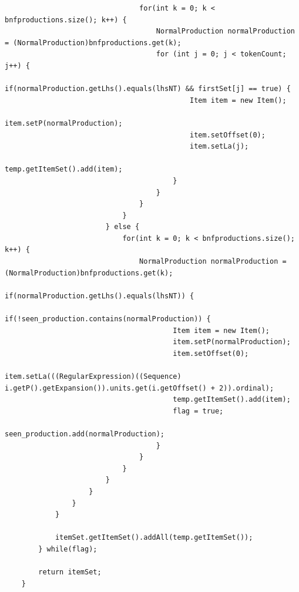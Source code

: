 \documentclass[•]{book}
\begin{document}
\begin{lstlisting}
								for(int k = 0; k < bnfproductions.size(); k++) {
									NormalProduction normalProduction = (NormalProduction)bnfproductions.get(k);
									for (int j = 0; j < tokenCount; j++) {
										if(normalProduction.getLhs().equals(lhsNT) && firstSet[j] == true) {
											Item item = new Item();
											item.setP(normalProduction);
											item.setOffset(0);
											item.setLa(j);
											temp.getItemSet().add(item);
										}
									}
								}
							}
						} else {
							for(int k = 0; k < bnfproductions.size(); k++) {
								NormalProduction normalProduction = (NormalProduction)bnfproductions.get(k);
								if(normalProduction.getLhs().equals(lhsNT)) {
									if(!seen_production.contains(normalProduction)) {								
										Item item = new Item();
										item.setP(normalProduction);
										item.setOffset(0);
										item.setLa(((RegularExpression)((Sequence) i.getP().getExpansion()).units.get(i.getOffset() + 2)).ordinal);
										temp.getItemSet().add(item);
										flag = true;
										seen_production.add(normalProduction);
									}
								}
							}
						}
					}
				}
			}
			
			itemSet.getItemSet().addAll(temp.getItemSet());
		} while(flag);
		
		return itemSet;
	}
\end{lstlisting}
\end{document}
